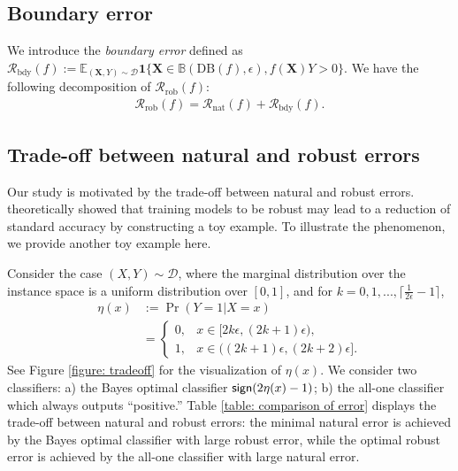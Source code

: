 \documentclass[11pt]{article}
\newcommand{\sign}{\textup{\textsf{sign}}}
\newcommand{\adv}{\mathrm{rob}}
\newcommand{\nat}{\mathrm{nat}}
\newcommand{\X}{\bm{X}}
\newcommand{\0}{\mathbf{0}}
\newcommand{\1}{\mathbf{1}}
\newcommand{\cD}{\mathcal{D}}
\newcommand{\cR}{\mathcal{R}}
\newcommand{\bbE}{\mathbb{E}}
\begin{document}
\subsection{Boundary error}

We introduce the \emph{boundary error} defined as 
$
    \mathcal{R}_{\text{bdy}}(f) :=\bbE_{(\X,Y)\sim\cD}\1\{\X \in \mathbb{B}(\text{DB}(f),\epsilon), f(\X)Y> 0\}.
$
We have the following decomposition of $\cR_\adv(f)$:
\begin{align} \label{eqn.fundamentalequation}
    \cR_\adv(f) = \cR_\nat(f) +\cR_{\text{bdy}}(f). 
\end{align}


\subsection{Trade-off between natural and robust errors}
\label{section: trade-off between natural and robust errors}

Our study is motivated by the trade-off between natural and robust errors.
\cite{tsipras2018robustness} theoretically showed that training models to be robust may lead to a reduction of standard accuracy by constructing a toy example. To illustrate the phenomenon, we provide another toy example here.

\medskip
{}
Consider the case $(X,Y)\sim\cD$, where the marginal distribution over the instance space is a uniform distribution over $[0,1]$, and for $k=0,1,...,\lceil\frac{1}{2\epsilon}-1\rceil$,
\begin{equation}
\label{equ: counterexample}
\begin{split}
\eta(x)&:=\Pr(Y=1|X=x)\\
&=
\begin{cases}
0, & x\in[2k\epsilon,(2k+1)\epsilon),\\
1, & x\in((2k+1)\epsilon,(2k+2)\epsilon].
\end{cases}
\end{split}
\end{equation}
See Figure \ref{figure: tradeoff} for the visualization of $\eta(x)$. We consider two classifiers: a) the Bayes optimal classifier $\sign(2\eta(x)-1)$; b) the all-one classifier which always outputs ``positive.'' Table \ref{table: comparison of error} displays the trade-off between natural and robust errors: the minimal natural error is achieved by the Bayes optimal classifier with large robust error, while the optimal robust error is achieved by the all-one classifier with large natural error. 
\end{document}
